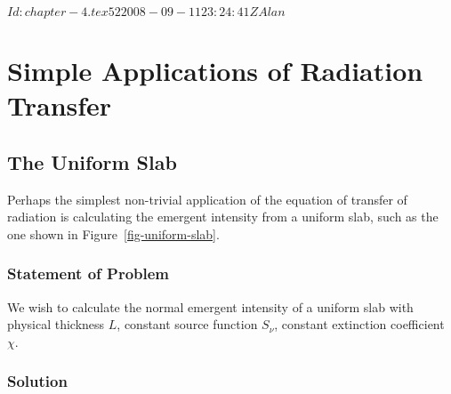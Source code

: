 
\svnInfo $Id: chapter-4.tex 52 2008-09-11 23:24:41Z Alan $

\chapter{Simple Applications of Radiation Transfer}

\section{The Uniform Slab}
\label{section-uniform-slab}

Perhaps the simplest non-trivial application of the equation of transfer of radiation is calculating the emergent intensity from a uniform slab, such as the one shown in Figure~\ref{fig-uniform-slab}.

\begin{figure*}[b]
\begin{center}
\end{center}
\caption{The geometry of a uniform slab.}
\label{fig-uniform-slab}
\end{figure*}

\newslide

\subsection{Statement of Problem}

We wish to calculate the normal emergent intensity of a uniform slab with physical thickness $L$, constant source function $S_\nu$, constant extinction coefficient $\chi$.

\subsection{Solution}

